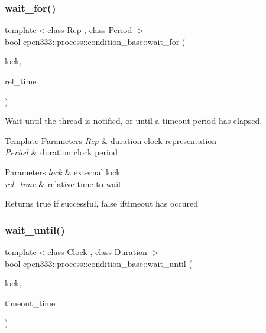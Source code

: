 \subsubsection{\texorpdfstring{wait\+\_\+for()}{wait\_for()}}
{\footnotesize\ttfamily template$<$class Rep , class Period $>$ \\
bool cpen333\+::process\+::condition\+\_\+base\+::wait\+\_\+for (\begin{DoxyParamCaption}\item[{std\+::unique\+\_\+lock$<$ \hyperlink{classcpen333_1_1process_1_1mutex}{cpen333\+::process\+::mutex} $>$ \&}]{lock,  }\item[{const std\+::chrono\+::duration$<$ Rep, Period $>$ \&}]{rel\+\_\+time }\end{DoxyParamCaption})\hspace{0.3cm}{\ttfamily [inline]}}



Wait until the thread is notified, or until a timeout period has elapsed. 


\begin{DoxyTemplParams}{Template Parameters}
{\em Rep} & duration clock representation \\
\hline
{\em Period} & duration clock period \\
\hline
\end{DoxyTemplParams}

\begin{DoxyParams}{Parameters}
{\em lock} & external lock \\
\hline
{\em rel\+\_\+time} & relative time to wait \\
\hline
\end{DoxyParams}
\begin{DoxyReturn}{Returns}
true if successful, false iftimeout has occured 
\end{DoxyReturn}
\mbox{\label{classcpen333_1_1process_1_1condition__base_a6af33a75565bf4177cb6616a08acaac0}} 
\subsubsection{\texorpdfstring{wait\+\_\+until()}{wait\_until()}}
{\footnotesize\ttfamily template$<$class Clock , class Duration $>$ \\
bool cpen333\+::process\+::condition\+\_\+base\+::wait\+\_\+until (\begin{DoxyParamCaption}\item[{std\+::unique\+\_\+lock$<$ \hyperlink{classcpen333_1_1process_1_1mutex}{cpen333\+::process\+::mutex} $>$ \&}]{lock,  }\item[{const std\+::chrono\+::time\+\_\+point$<$ Clock, Duration $>$ \&}]{timeout\+\_\+time }\end{DoxyParamCaption})\hspace{0.3cm}{\ttfamily [inline]}}



